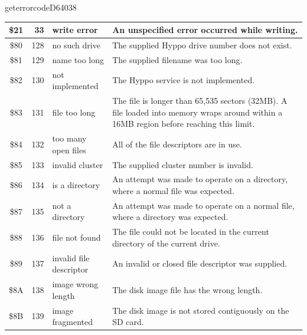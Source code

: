 \begin{hyppotrap}{geterrorcode}{D640}{38}
{\begin{longtable}{|c|r|l|p{8cm}|}
    \\\hline
    \index{Hyppo Error Codes!\$21}
    \$21 & 33 & write error &
    An unspecified error occurred while writing.
    \\\hline
    \index{Hyppo Error Codes!\$80}
    \$80 & 128 & no such drive &
    The supplied Hyppo drive number does not exist.
    \\\hline
    \index{Hyppo Error Codes!\$81}
    \$81 & 129 & {name too long} &
    The supplied filename was too long.
    \\\hline
    \index{Hyppo Error Codes!\$82}
    \$82 & 130 & not implemented &
    The Hyppo service is not implemented.
    \\\hline
    \index{Hyppo Error Codes!\$83}
    \$83 & 131 & file too long &
    The file is longer than 65,535 sectors (32MB). A file loaded into memory
    wraps around within a 16MB region before reaching this limit.
    \\\hline
    \index{Hyppo Error Codes!\$84}
    \$84 & 132 & \makecell[tl]{too many\\open files} &
    All of the file descriptors are in use.
    \\\hline
    \index{Hyppo Error Codes!\$85}
    \$85 & 133 & invalid cluster &
    The supplied cluster number is invalid.
    \\\hline
    \index{Hyppo Error Codes!\$86}
    \$86 & 134 & is a directory &
    An attempt was made to operate on a directory, where a normal file was
    expected.
    \\\hline
    \index{Hyppo Error Codes!\$87}
    \$87 & 135 & not a directory &
    An attempt was made to operate on a normal file, where a directory was
    expected.
    \\\hline
    \index{Hyppo Error Codes!\$88}
    \$88 & 136 & file not found &
    The file could not be located in the current directory of the current drive.
    \\\hline
    \index{Hyppo Error Codes!\$89}
    \$89 & 137 & \makecell[tl]{invalid file\\descriptor} &
    An invalid or closed file descriptor was supplied.
    \\\hline
    \index{Hyppo Error Codes!\$8A}
    \$8A & 138 & \makecell[tl]{image wrong\\length} &
    The disk image file has the wrong length.
    \\\hline
    \index{Hyppo Error Codes!\$8B}
    \$8B & 139 & image fragmented &
    The disk image is not stored contiguously on the SD card.

\end{longtable}}
\end{hyppotrap}
